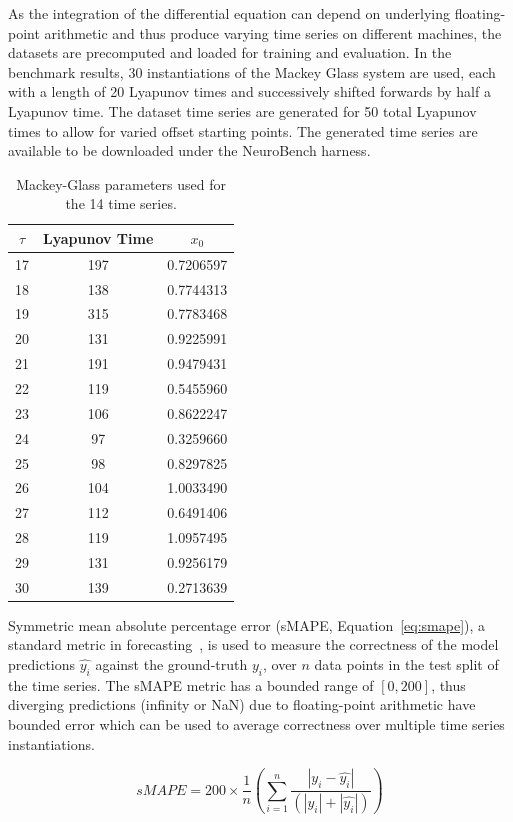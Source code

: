 As the integration of the differential equation can depend on underlying floating-point arithmetic and thus produce varying time series on different machines, the datasets are precomputed and loaded for training and evaluation. In the benchmark results, 30 instantiations of the Mackey Glass system are used, each with a length of 20 Lyapunov times and successively shifted forwards by half a Lyapunov time. The dataset time series are generated for 50 total Lyapunov times to allow for varied offset starting points. The generated time series are available to be downloaded under the NeuroBench harness.

\begin{table}[ht]    
    \begin{center}
    \begin{tabular}{|c|c|c|}
        \hline
        $\tau$ & Lyapunov Time & $x_0$ \\ \hline
        17 & 197 & 0.7206597 \\
        18 & 138 & 0.7744313 \\
        19 & 315 & 0.7783468 \\
        20 & 131 & 0.9225991 \\
        21 & 191 & 0.9479431 \\
        22 & 119 & 0.5455960 \\
        23 & 106 & 0.8622247 \\
        24 & 97 & 0.3259660 \\
        25 & 98 & 0.8297825 \\
        26 & 104 & 1.0033490 \\
        27 & 112 & 0.6491406 \\
        28 & 119 & 1.0957495 \\
        29 & 131 & 0.9256179 \\
        30 & 139 & 0.2713639 \\
        \hline
    \end{tabular}
    \end{center}
    \caption{Mackey-Glass parameters used for the 14 time series.}
\label{tab:MG_params}
\end{table}

Symmetric mean absolute percentage error (sMAPE, Equation~\ref{eq:smape}), a standard metric in forecasting~\cite{MAKRIDAKIS202054}, is used to measure the correctness of the model predictions $\hat{y_i}$ against the ground-truth $y_i$, over $n$ data points in the test split of the time series. 
The sMAPE metric has a bounded range of $[0, 200]$, thus diverging predictions (infinity or NaN) due to floating-point arithmetic have bounded error which can be used to average correctness over multiple time series instantiations.

\begin{equation} \label{eq:smape}
    sMAPE = 200 \times \frac{1}{n} \left( \sum_{i=1}^{n} \frac{|y_i - \hat{y_i}|}{(|y_i| + |\hat{y_i}|)}\right)
\end{equation}
